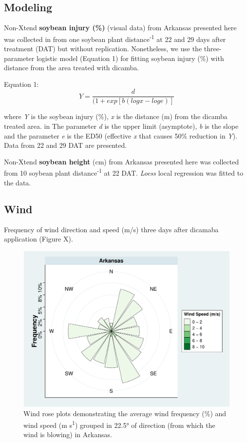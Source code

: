 \documentclass[]{article}
\begin{document}
\newpage

\subsection{Modeling}\label{modeling}

Non-Xtend \textbf{soybean injury (\%)} (visual data) from Arkansas
presented here was collected in from one soybean plant
distance\textsuperscript{-1} at 22 and 29 days after treatment (DAT) but
without replication. Nonetheless, we use the three-parameter logistic
model (Equation 1) for fitting soybean injury (\%) with distance from
the area treated with dicamba.

Equation 1: \[Y= \frac{d}{(1 + exp[b(logx - loge)]} \]

where \emph{Y} is the soybean injury (\%), \emph{x} is the distance (m)
from the dicamba treated area. in The parameter \emph{d} is the upper
limit (asymptote), \emph{b} is the slope and the parameter \emph{e} is
the ED50 (effective \emph{x} that causes 50\% reduction in \emph{Y}).
Data from 22 and 29 DAT are presented.

Non-Xtend \textbf{soybean height} (cm) from Arkansas presented here was
collected from 10 soybean plant distance\textsuperscript{-1} at 22 DAT.
\emph{Loess} local regression was fitted to the data.

\pagebreak
\newpage

\subsection{Wind}\label{wind}

Frequency of wind direction and speed (m/s) three days after dicamaba
application (Figure X).

\begin{figure}
\centering
\includegraphics{Report_Dicamba_study_files/figure-latex/unnamed-chunk-6-1.pdf}
\caption{Wind rose plots demonstrating the average wind frequency (\%)
and wind speed (m s\textsuperscript{1}) grouped in 22.5° of direction
(from which the wind is blowing) in Arkansas.}
\end{figure}
\end{document}
